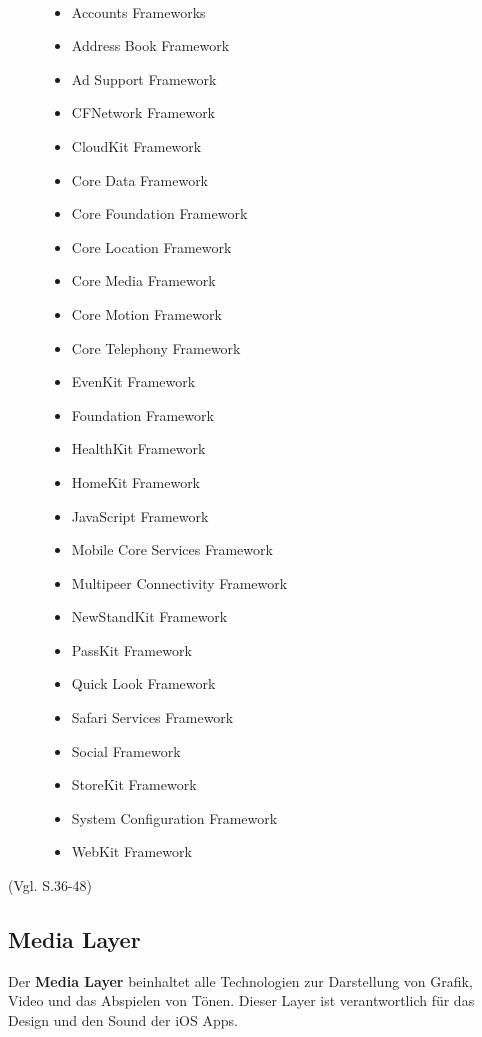 \newpage
\begin{description}	
	\item[\parbox{\textwidth} {Das Core Service Layer Framework beinhaltet folgende Frameworks}]~\par
	\begin{multicols}{2}
	\begin{itemize}
		\item Accounts Frameworks
		\item Address Book Framework
		\item Ad Support Framework
		\item CFNetwork Framework
		\item CloudKit Framework
		\item Core Data Framework
		\item Core Foundation Framework
		\item Core Location Framework
		\item Core Media Framework
		\item Core Motion Framework
		\item Core Telephony Framework
		\item EvenKit Framework
		\item Foundation Framework
		\item HealthKit Framework
		\item HomeKit Framework
		\item JavaScript Framework
		\item Mobile Core Services Framework
		\item Multipeer Connectivity Framework
		\item NewStandKit Framework
		\item PassKit Framework
		\item Quick Look Framework
		\item Safari Services Framework
		\item Social Framework
		\item StoreKit Framework
		\item System Configuration Framework
		\item WebKit Framework
	\end{itemize}
	\end{multicols}
\end{description}
(Vgl. \cite{Apple[6]} S.36-48)
\subsection{Media Layer}
\label{sec:MediaLayer}		
Der \textbf{Media Layer} beinhaltet alle Technologien zur Darstellung von Grafik, Video und das Abspielen von Tönen. Dieser Layer ist verantwortlich für das Design und den Sound der iOS Apps. 

